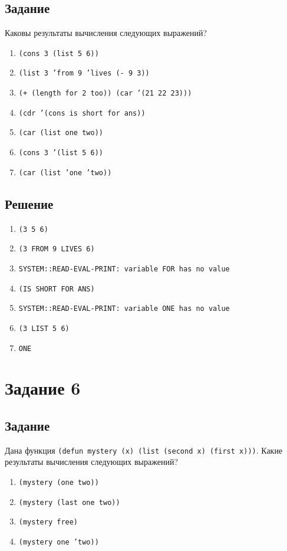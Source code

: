 \subsection*{Задание}
Каковы результаты вычисления следующих выражений?

\begin{enumerate}
	\item \texttt{(cons 3 (list 5 6))}
	\item \texttt{(list 3 'from 9 'lives (- 9 3))}
	\item \texttt{(+ (length for 2 too)) (car '(21 22 23)))}
	\item \texttt{(cdr '(cons is short for ans))}
	\item \texttt{(car (list one two))}
	\item \texttt{(cons 3 '(list 5 6))}
	\item \texttt{(car (list 'one 'two))}
\end{enumerate}


\subsection*{Решение}
\begin{enumerate}
	\item \texttt{(3 5 6)}
	\item \texttt{(3 FROM 9 LIVES 6)}
	\item \texttt{SYSTEM::READ-EVAL-PRINT: variable FOR has no value}
	\item \texttt{(IS SHORT FOR ANS)}
	\item \texttt{SYSTEM::READ-EVAL-PRINT: variable ONE has no value}
	\item \texttt{(3 LIST 5 6)}
	\item \texttt{ONE}
\end{enumerate}

\section{Задание 6}
\subsection*{Задание}
Дана функция \texttt{(defun mystery (x) (list (second x) (first x)))}. Какие результаты вычисления следующих выражений?

\begin{enumerate}
	\item \texttt{(mystery (one two))}
	\item \texttt{(mystery (last one two))}
	\item \texttt{(mystery free)}
	\item \texttt{(mystery one 'two))}
\end{enumerate}


